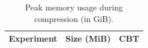 \begin{table}[t]
\caption{Peak memory usage during compression  (in GiB). }
\label{t:memory-compression}
\centering
\setlength{\tabcolsep}{5pt}
\begin{tabular}{|l|c|c|}
\hline
Experiment & Size (MiB) & CBT \\
\hline
\hline
\end{tabular}
\end{table}